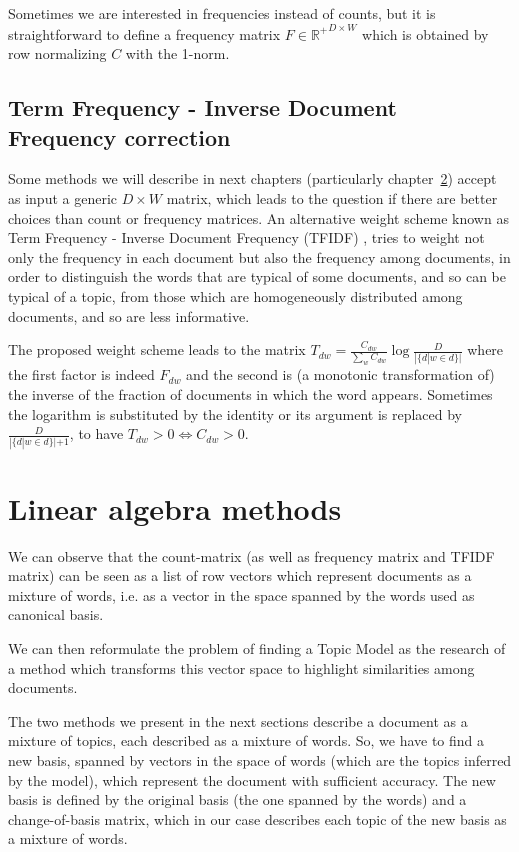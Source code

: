\documentclass[11pt, a4paper, oneside, openright]{book}
\begin{document}
Sometimes we are interested in frequencies instead of counts, but it is straightforward to define a frequency matrix $F \in {\mathbb{R}^+}^{D \times W}$ which is obtained by row normalizing $C$ with the 1-norm.

\section{Term Frequency - Inverse Document Frequency correction}
\label{sec:tfidf}
Some methods we will describe in next chapters (particularly chapter~\ref{ch:spect}) accept as input a generic $D \times W$ matrix, which leads to the question if there are better choices than count or frequency matrices. An alternative weight scheme known as Term Frequency - Inverse Document Frequency (TFIDF) \parencite{salton1988}, tries to weight not only the frequency in each document but also the frequency among documents, in order to distinguish the words that are typical of some documents, and so can be typical of a topic, from those which are homogeneously distributed among documents, and so are less informative.

The proposed weight scheme leads to the matrix $T_{dw} = \frac{C_{dw}}{\sum_w C_{dw}} \log \frac{D}{|\{d | w \in d\}|}$ where the first factor is indeed $F_{dw}$ and the second is (a monotonic transformation of) the inverse of the fraction of documents in which the word appears. Sometimes the logarithm is substituted by the identity or its argument is replaced by $\frac{D}{|\{d | w \in d\}| + 1}$, to have $T_{dw} > 0 \iff C_{dw} > 0$.

\chapter{Linear algebra methods}
\label{ch:spect}
We can observe that the count-matrix (as well as frequency matrix and TFIDF matrix) can be seen as a list of row vectors which represent documents as a mixture of words, i.e. as a vector in the space spanned by the words used as canonical basis.

We can then reformulate the problem of finding a Topic Model as the research of a method which transforms this vector space to highlight similarities among documents.

The two methods we present in the next sections describe a document as a mixture of topics, each described as a mixture of words.
So, we have to find a new basis, spanned by vectors in the space of words (which are the topics inferred by the model), which represent the document with sufficient accuracy.
The new basis is defined by the original basis (the one spanned by the words) and a change-of-basis matrix, which in our case describes each topic of the new basis as a mixture of words.
\end{document}
